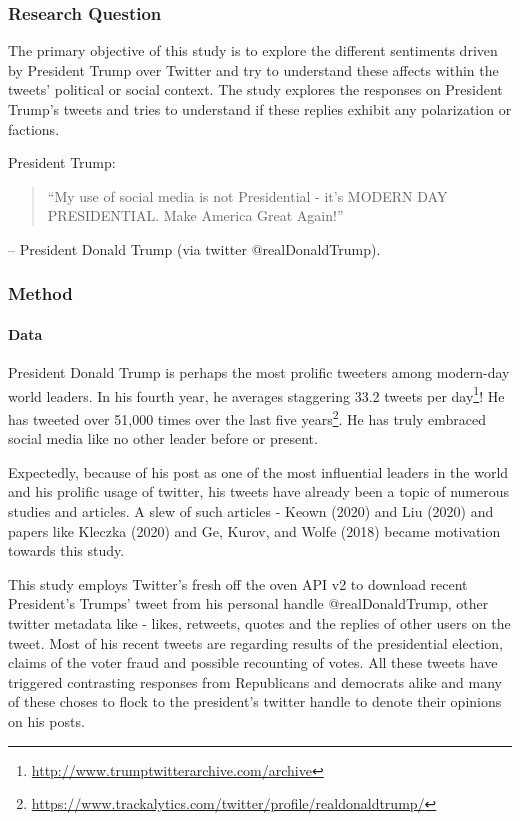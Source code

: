 \documentclass[
]{article}
\begin{document}
\hypertarget{research-question}{%
\subsubsection{Research Question}\label{research-question}}

The primary objective of this study is to explore the different
sentiments driven by President Trump over Twitter and try to understand
these affects within the tweets' political or social context. The study
explores the responses on President Trump's tweets and tries to
understand if these replies exhibit any polarization or factions.

President Trump:

\begin{quote}
``My use of social media is not Presidential - it's MODERN DAY
PRESIDENTIAL. Make America Great Again!''
\end{quote}

\raggedleft

-- President Donald Trump (via twitter @realDonaldTrump).

\hypertarget{method}{%
\subsubsection{Method}\label{method}}

\hypertarget{data}{%
\paragraph{Data}\label{data}}

President Donald Trump is perhaps the most prolific tweeters among
modern-day world leaders. In his fourth year, he averages staggering
33.2 tweets per day\footnote{\url{http://www.trumptwitterarchive.com/archive}}!
He has tweeted over 51,000 times over the last five years\footnote{\url{https://www.trackalytics.com/twitter/profile/realdonaldtrump/}}.
He has truly embraced social media like no other leader before or
present.

Expectedly, because of his post as one of the most influential leaders
in the world and his prolific usage of twitter, his tweets have already
been a topic of numerous studies and articles. A slew of such articles -
Keown (2020) and Liu (2020) and papers like Kleczka (2020) and Ge,
Kurov, and Wolfe (2018) became motivation towards this study.

This study employs Twitter's fresh off the oven API v2 to download
recent President's Trumps' tweet from his personal handle
@realDonaldTrump, other twitter metadata like - likes, retweets, quotes
and the replies of other users on the tweet. Most of his recent tweets
are regarding results of the presidential election, claims of the voter
fraud and possible recounting of votes. All these tweets have triggered
contrasting responses from Republicans and democrats alike and many of
these choses to flock to the president's twitter handle to denote their
opinions on his posts.
\end{document}
